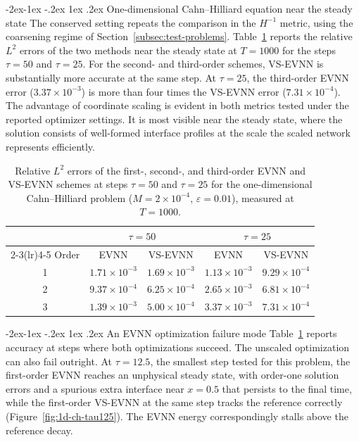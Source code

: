 \documentclass[11pt,letterpaper]{article}
\makeatletter
\theoremstyle{plain}
\theoremstyle{definition}
\renewcommand\subsubsection{\@startsection{subsubsection}{3}{\z@}%
                                     {-2ex\@plus -1ex \@minus -.2ex}%
                                     {1ex \@plus .2ex}%
                                     {\normalfont\normalsize\bfseries}}
\makeatother
\begin{document}
\subsubsection{One-dimensional Cahn--Hilliard equation near the steady state} The conserved setting repeats the comparison in the $H^{-1}$ metric, using the coarsening regime of Section~\ref{subsec:test-problems}. Table~\ref{tab:1d-ch-evnn-vs} reports the relative $L^2$ errors of the two methods near the steady state at $T=1000$ for the steps $\tau=50$ and $\tau=25$. For the second- and third-order schemes, VS-EVNN is substantially more accurate at the same step. At $\tau=25$, the third-order EVNN error ($3.37\times10^{-3}$) is more than four times the VS-EVNN error ($7.31\times10^{-4}$). The advantage of coordinate scaling is evident in both metrics tested under the reported optimizer settings. It is most visible near the steady state, where the solution consists of well-formed interface profiles at the scale the scaled network represents efficiently.

\begin{table}[H]
\centering
\caption{Relative $L^2$ errors of the first-, second-, and third-order EVNN and VS-EVNN schemes at steps $\tau=50$ and $\tau=25$ for the one-dimensional Cahn--Hilliard problem ($M=2\times10^{-4}$, $\varepsilon=0.01$), measured at $ T=1000$.}
\label{tab:1d-ch-evnn-vs}
\begin{tabular}{c c c c c}
\toprule
 & \multicolumn{2}{c}{$\tau=50$} & \multicolumn{2}{c}{$\tau=25$} \\
\cmidrule(lr){2-3}\cmidrule(lr){4-5}
Order & EVNN & VS-EVNN & EVNN & VS-EVNN \\
\midrule
1 & $1.71\times10^{-3}$ & $1.69\times10^{-3}$ & $1.13\times10^{-3}$ & $9.29\times10^{-4}$ \\
2 & $9.37\times10^{-4}$ & $6.25\times10^{-4}$ & $2.65\times10^{-3}$ & $6.81\times10^{-4}$ \\
3 & $1.39\times10^{-3}$ & $5.00\times10^{-4}$ & $3.37\times10^{-3}$ & $7.31\times10^{-4}$ \\
\bottomrule
\end{tabular}
\end{table}

\subsubsection{An EVNN optimization failure mode} Table~\ref{tab:1d-ch-evnn-vs} reports accuracy at steps where both optimizations succeed. The unscaled optimization can also fail outright. At $\tau=12.5$, the smallest step tested for this problem, the first-order EVNN reaches an unphysical steady state, with order-one solution errors and a spurious extra interface near $x=0.5$ that persists to the final time, while the first-order VS-EVNN at the same step tracks the reference correctly (Figure~\ref{fig:1d-ch-tau125}). The EVNN energy correspondingly stalls above the reference decay.
\end{document}
